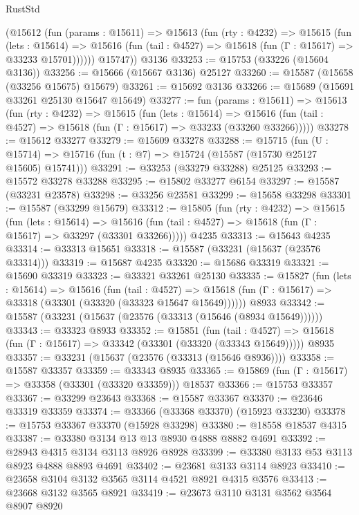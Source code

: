 \begin{lexlean}{RustStd}
\begin{coremodule}
        (@15612
          (fun (params : @15611) =>
          @15613
            (fun (rty : @4232) =>
            @15615
              (fun (lets : @15614) =>
              @15616 (fun (tail : @4527) => @15618 (fun (Γ : @15617) => @33233 @15701))))))
        @15747))
    @3136
@33253 := @15753 (@33226 (@15604 @3136))
@33256 := @15666 (@15667 @3136) @25127
@33260 := @15587 (@15658 (@33256 @15675) @15679)
@33261 := @15692 @3136
@33266 := @15689 (@15691 @33261 @25130 @15647 @15649)
@33277 := fun (params : @15611) =>
  @15613
    (fun (rty : @4232) =>
    @15615
      (fun (lets : @15614) =>
      @15616 (fun (tail : @4527) => @15618 (fun (Γ : @15617) => @33233 (@33260 @33266)))))
@33278 := @15612 @33277
@33279 := @15609 @33278
@33288 := @15715
    (fun (U : @15714) => @15716 (fun (t : @7) => @15724 (@15587 (@15730 @25127 @15605) @15741)))
@33291 := @33253 (@33279 @33288) @25125
@33293 := @15572 @33278 @33288
@33295 := @15802 @33277 @6154
@33297 := @15587 (@33231 @23578)
@33298 := @33256 @23581
@33299 := @15658 @33298
@33301 := @15587 (@33299 @15679)
@33312 := @15805
    (fun (rty : @4232) =>
    @15615
      (fun (lets : @15614) =>
      @15616 (fun (tail : @4527) => @15618 (fun (Γ : @15617) => @33297 (@33301 @33266)))))
    @4235
@33313 := @15643 @4235
@33314 := @33313 @15651
@33318 := @15587 (@33231 (@15637 (@23576 @33314)))
@33319 := @15687 @4235
@33320 := @15686 @33319
@33321 := @15690 @33319
@33323 := @33321 @33261 @25130
@33335 := @15827
    (fun (lets : @15614) =>
    @15616
      (fun (tail : @4527) =>
      @15618 (fun (Γ : @15617) => @33318 (@33301 (@33320 (@33323 @15647 @15649))))))
    @8933
@33342 := @15587 (@33231 (@15637 (@23576 (@33313 (@15646 (@8934 @15649))))))
@33343 := @33323 @8933
@33352 := @15851
    (fun (tail : @4527) => @15618 (fun (Γ : @15617) => @33342 (@33301 (@33320 (@33343 @15649)))))
    @8935
@33357 := @33231 (@15637 (@23576 (@33313 (@15646 @8936))))
@33358 := @15587 @33357
@33359 := @33343 @8935
@33365 := @15869 (fun (Γ : @15617) => @33358 (@33301 (@33320 @33359))) @18537
@33366 := @15753 @33357
@33367 := @33299 @23643
@33368 := @15587 @33367
@33370 := @23646 @33319 @33359
@33374 := @33366 (@33368 @33370) (@15923 @33230)
@33378 := @15753 @33367 @33370 (@15928 @33298)
@33380 := @18558 @18537 @4315
@33387 := @33380 @3134 @13 @13 @8930 @4888 @8882 @4691
@33392 := @28943 @4315 @3134 @3113 @8926 @8928
@33399 := @33380 @3133 @53 @3113 @8923 @4888 @8893 @4691
@33402 := @23681 @3133 @3114 @8923
@33410 := @23658 @3104 @3132 @3565 @3114 @4521 @8921 @4315 @3576
@33413 := @23668 @3132 @3565 @8921
@33419 := @23673 @3110 @3131 @3562 @3564 @8907 @8920

\end{coremodule}
\end{lexlean}
